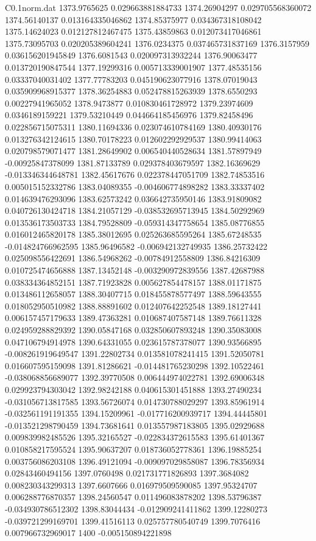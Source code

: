 \begin{filecontents}{C0.1norm.dat}
1373.9765625		0.029663881884733
1374.26904297		0.029705568360072
1374.56140137		0.013164335046862
1374.85375977		0.034367318108042
1375.14624023		0.012127812467475
1375.43859863		0.012073417046861
1375.73095703		0.020205389604241
1376.0234375		0.037465731837169
1376.3157959		0.036156201945849
1376.6081543		0.020097313932244
1376.90063477		0.013720190847544
1377.19299316		0.005713339001907
1377.48535156		0.03337040031402
1377.77783203		0.045190623077916
1378.07019043		0.035909968915377
1378.36254883		0.052478815263939
1378.6550293		0.00227941965052
1378.9473877		0.010830461728972
1379.23974609		0.0346189159221
1379.53210449		0.044664185456976
1379.82458496		0.022856715075311
1380.11694336		0.023074610784169
1380.40930176		0.013276342124615
1380.70178223		0.012602292929537
1380.99414063		0.020798579071477
1381.28649902		0.006540440528634
1381.57897949		-0.00925847378099
1381.87133789		0.029378403679597
1382.16369629		-0.013346344648781
1382.45617676		0.022378447051709
1382.74853516		0.005015152332786
1383.04089355		-0.004606774898282
1383.33337402		0.014639476293096
1383.62573242		0.036642735950146
1383.91809082		0.040726130424718
1384.21057129		-0.038532695713945
1384.50292969		0.013536173503733
1384.79528809		-0.059314347758654
1385.08776855		0.016012465820178
1385.38012695		0.025263685595264
1385.67248535		-0.014824766962595
1385.96496582		-0.006942132749935
1386.25732422		0.025098556422691
1386.54968262		-0.00784912558809
1386.84216309		0.010725474656888
1387.13452148		-0.003290972839556
1387.42687988		0.038334364852151
1387.71923828		0.005627854478157
1388.01171875		0.013486112658057
1388.30407715		0.018455878577497
1388.59643555		0.018052950510982
1388.88891602		0.012407642252548
1389.18127441		0.006157457179633
1389.47363281		0.010687407587148
1389.76611328		0.024959288829392
1390.05847168		0.032850607893248
1390.35083008		0.047106794914978
1390.64331055		0.023615787378077
1390.93566895		-0.008261919649547
1391.22802734		0.013581078241415
1391.52050781		0.016607595159098
1391.81286621		-0.014481765230298
1392.10522461		-0.038068856689077
1392.39770508		0.006444974022781
1392.69006348		0.029923794303042
1392.98242188		0.040615301451888
1393.27490234		-0.031056713817585
1393.56726074		0.014730788029297
1393.85961914		-0.032561191191355
1394.15209961		-0.017716200939717
1394.44445801		-0.013521298790459
1394.73681641		0.013557987183805
1395.02929688		0.009839982485526
1395.32165527		-0.022834372615583
1395.61401367		0.010858217595524
1395.90637207		0.018736052778361
1396.19885254		0.003756086203108
1396.49121094		-0.009097029858087
1396.78356934		0.02843460494156
1397.0760498		0.021731771826893
1397.3684082		0.008230343299313
1397.6607666		0.016979509590085
1397.95324707		0.006288776870357
1398.24560547		0.011496083878202
1398.53796387		-0.034930786512302
1398.83044434		-0.012909241411862
1399.12280273		-0.039721299169701
1399.41516113		0.025757780540749
1399.7076416		0.007966732969017
1400		-0.005150894221898
\end{filecontents}

